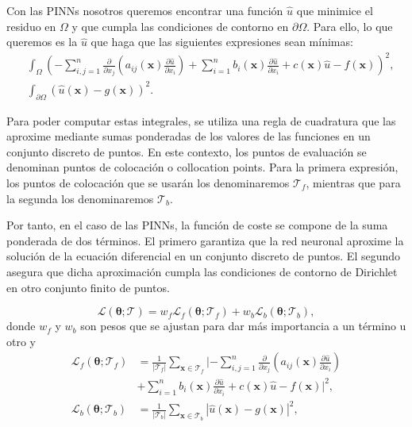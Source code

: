 \documentclass[a4paper,11pt,spanish, twoside, leqno]{tfg-uam}
\theoremstyle{definition}
\begin{document}
Con las PINNs nosotros queremos encontrar una función $\hat{u}$ que minimice el residuo en $\Omega$ y que cumpla las condiciones de contorno en $\partial\Omega$. Para ello, lo que queremos es la $\hat{u}$ que haga que las siguientes expresiones sean mínimas:
\begin{align*}
    &\int_{\Omega} \left( -\sum_{i,j=1}^{n} \frac{\partial}{\partial x_j}\left( a_{ij}(\mathbf{x})\frac{\partial \hat{u}}{\partial x_i}\right) + \sum_{i=1}^{n} b_i(\mathbf{x})\frac{\partial \hat{u}}{\partial x_i} + c(\mathbf{x})\hat{u} - f(\mathbf{x}) \right)^2, \\ 
    &\int_{\partial\Omega} \left( \hat{u} (\mathbf{x}) - g(\mathbf{x})\right)^2.
\end{align*}

Para poder computar estas integrales, se utiliza una regla de cuadratura que las aproxime mediante sumas ponderadas de los valores de las funciones en un conjunto discreto de puntos. En este contexto, los puntos de evaluación se denominan puntos de colocación o collocation points. Para la primera expresión, los puntos de colocación que se usarán los denominaremos $\mathcal{T}_f$, mientras que para la segunda los denominaremos $\mathcal{T}_b$. 

Por tanto, en el caso de las PINNs, la función de coste se compone de la suma ponderada de dos términos. El primero garantiza que la red neuronal aproxime la solución de la ecuación diferencial en un conjunto discreto de puntos. El segundo asegura que dicha aproximación cumpla las condiciones de contorno de Dirichlet en otro conjunto finito de puntos.

\begin{equation} \label{eq:L_PINN}
    \mathcal{L}(\boldsymbol{\theta}; \mathcal{T}) = w_f \mathcal{L}_f(\boldsymbol{\theta}; \mathcal{T}_f) + w_b \mathcal{L}_b(\boldsymbol{\theta}; \mathcal{T}_b),
\end{equation}
donde $w_f$ y $w_b$ son pesos que se ajustan para dar más importancia a un término u otro y
\begin{equation}
    \label{eq:Lf_Lb}
    \begin{split}
        \mathcal{L}_f(\boldsymbol{\theta}; \mathcal{T}_f) &= \frac{1}{|\mathcal{T}_f|} \sum_{\mathbf{x} \in \mathcal{T}_f} | -\sum_{i,j=1}^{n} \frac{\partial}{\partial x_j}\left( a_{ij}(\mathbf{x})\frac{\partial \hat{u}}{\partial x_i}\right) \\ &+ \sum_{i=1}^{n} b_i(\mathbf{x})\frac{\partial \hat{u}}{\partial x_i} + c(\mathbf{x})\hat{u} - f(\mathbf{x}) |^2, \\ 
        \mathcal{L}_b(\boldsymbol{\theta}; \mathcal{T}_b) &= \frac{1}{|\mathcal{T}_b|} \sum_{\mathbf{x} \in \mathcal{T}_b} \left| \hat{u} (\mathbf{x}) - g(\mathbf{x})\right|^2,
    \end{split}
\end{equation}
\end{document}
